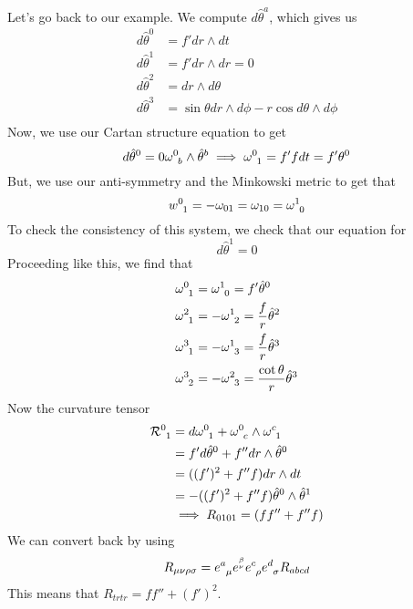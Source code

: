 Let's go back to our example. We compute 
$ d \hat{ \theta } ^ a $, which gives us 
\begin{align*}
	d \hat{ \theta } ^ 0 &= f' dr \wedge  dt \\
	d \hat{ \theta } ^ 1 &=  f' dr \wedge  dr =  0  \\
	d \hat{ \theta } ^ 2 &=  dr \wedge  d \theta  \\ 
	d \hat{ \theta } ^ 3 &=  \sin \theta dr \wedge  d \phi - r \cos d \theta \wedge  d \phi  \\
\end{align*} 
Now, we use our Cartan structure equation to get 
\[
 d \hat{ \theta } ^ 0 = 0 \omega \indices{ ^ 0 _ b } \wedge  \hat{ \theta } ^ b 
 \implies \omega \indices{ ^ 0 _ 1 } = f'  f dt = f ' \theta ^ 0  
\] But, we use our anti-symmetry and the Minkowski 
metric to get that 
\[
 w \indices{ ^ 0 _ 1 } = - \omega _{ 0 1} = \omega _{ 10 } = \omega \indices{ ^ 1 _ 0 }  
\] To check the consistency of this system, 
we check that our equation for 
\[
 d \hat{ \theta } ^ 1 = 0 
\] Proceeding like this, we find that 
\begin{align*}
	\omega \indices{ ^ 0 _ 1 } &=  \omega \indices{ ^ 1 _ 0 } = f ' \hat{ \theta  } ^ 0   \\
	\omega \indices{ ^ 2 _ 1 } &= - \omega \indices{ ^ 1 _ 2  } = \frac{ f }{ r } \hat{ \theta }^ 2 \\
	\omega \indices{ ^ 3 _  1 }   &= - \omega \indices{ ^ 1 _ 3 } = \frac{f}{r } \hat{ \theta } ^ 3 \\
	\omega \indices{ ^ 3 _ 2 } &= - \omega \indices{ ^ 2 _ 3 }   = \frac{ \cot \theta }{ r  } \hat{ \theta } ^ 3 
\end{align*}
Now the curvature tensor 
\begin{align*}
	\mathcal{ R } \indices{ ^ 0 _ 1 } &=  d \omega \indices{ ^ 0 _ 1 }  + \omega \indices{ ^ 0 _ c 
	} \wedge  \omega \indices{ ^ c _ 1 }     \\
	&=  f ' d \hat{ \theta } ^ 0 + f'' dr \wedge  \hat{ \theta } ^ 0  \\
	&=  ( ( f ' ) ^ 2 + f '' f ) dr \wedge  dt  \\
	&=   - ( ( f ' ) ^ 2 + f '' f ) \hat{ \theta } ^ 0 \wedge  \hat{ \theta } ^ 1  \\
	& \implies R_{ 0101 }  = ( f f '' + f '' f ) 
\end{align*} 
We can convert back by using 
\[
	R_{ \mu \nu \rho \sigma } = e \indices{ ^ a _ \mu } e ^{ ^ \beta _ \nu } e \indices{ ^ c _ \rho } 
	e \indices{ ^ d _ \sigma } R _{ abc d} 
\] This means that $ R _{ trtr }  = f f'' + ( f' ) ^ 2$. 

